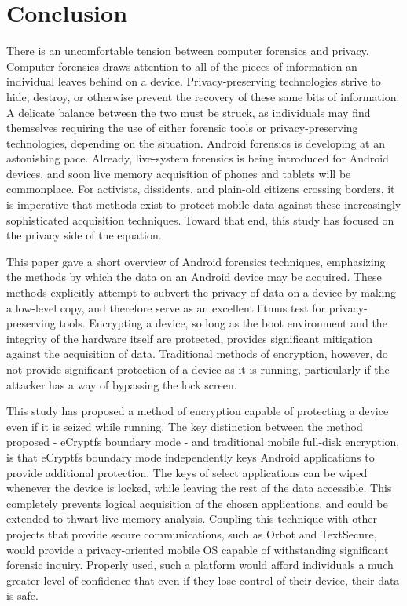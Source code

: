 \chapter{Conclusion}

There is an uncomfortable tension between computer forensics and privacy. Computer forensics draws attention to all of the pieces of
information an individual leaves behind on a device.  Privacy-preserving technologies strive to hide, destroy, or otherwise prevent
the recovery of these same bits of information. A delicate balance between the two must be struck, as individuals may find
themselves requiring the use of either forensic tools or privacy-preserving technologies, depending on the situation. 
Android forensics is developing at an astonishing pace.  Already, live-system forensics is being introduced for Android devices, and
soon live memory acquisition of phones and tablets will be commonplace. For activists, dissidents, and plain-old citizens crossing
borders, it is imperative that methods exist to protect mobile data against these increasingly sophisticated acquisition techniques.
Toward that end, this study has focused on the privacy side of the equation.

This paper gave a short overview of Android forensics techniques, emphasizing the methods by which the data
on an Android device may be acquired. These methods explicitly attempt to subvert the privacy of data on a device by making a
low-level copy, and therefore serve as an excellent litmus test for privacy-preserving tools. Encrypting a device, so long as the
boot environment and the integrity of the hardware itself are protected, provides significant mitigation against the acquisition of
data. Traditional methods of encryption, however, do not provide significant protection of a device as it is running, particularly
if the attacker has a way of bypassing the lock screen.

This study has proposed a method of encryption capable of protecting a device even if it is seized while running.  The key
distinction between the method proposed - eCryptfs boundary mode - and traditional mobile full-disk encryption, is that eCryptfs
boundary mode independently keys Android applications to provide additional protection. The keys of select applications can be wiped
whenever the device is locked, while leaving the rest of the data accessible. This completely prevents logical acquisition of the
chosen applications, and could be extended to thwart live memory analysis. Coupling this technique with other projects
that provide secure communications, such as Orbot and TextSecure, would provide a privacy-oriented mobile OS capable of withstanding
significant forensic inquiry. Properly used, such a platform would afford individuals a much greater level of confidence that even
if they lose control of their device, their data is safe.

